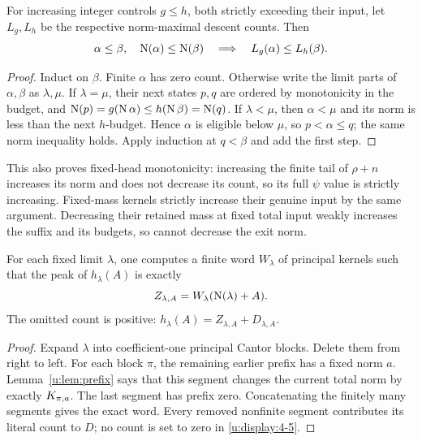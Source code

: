 \begin{lemma}\label{u:lem:counts}
For increasing integer controls $g\le h$, both strictly exceeding their
input, let $L_g,L_h$ be the respective norm-maximal descent counts.
Then
\begin{equation}
 \alpha\le\beta,\quad\operatorname{N}(\alpha)\le\operatorname{N}(\beta)
       \quad\Longrightarrow\quad L_g(\alpha)\le L_h(\beta). \label{u:display:4-4}
\end{equation}
\end{lemma}
\begin{proof}
Induct on $\beta$. Finite $\alpha$ has zero count. Otherwise write the
limit parts of $\alpha,\beta$ as $\lambda,\mu$. If $\lambda=\mu$, their
next states $p,q$ are ordered by monotonicity in the budget, and
$\operatorname{N}(p)=g(\operatorname{N}\alpha)\le h(\operatorname{N}\beta)=\operatorname{N}(q)$.
If $\lambda<\mu$, then $\alpha<\mu$ and its norm is less than the next
$h$-budget. Hence $\alpha$ is eligible below $\mu$, so
$p<\alpha\le q$; the same norm inequality holds. Apply induction at
$q<\beta$ and add the first step.
\end{proof}
This also proves fixed-head monotonicity: increasing the finite tail of
$\rho+n$ increases its norm and does not decrease its count, so its full
$\psi$ value is strictly increasing. Fixed-mass kernels strictly increase
their genuine input by the same argument. Decreasing their retained mass
at fixed total input weakly increases the suffix and its budgets, so cannot
decrease the exit norm.

\begin{lemma}\label{u:lem:peakword}
For each fixed limit $\lambda$, one computes a finite word $W_\lambda$ of
principal kernels such that the peak of $h_\lambda(A)$ is exactly
\begin{equation}
             Z_{\lambda,A}=W_\lambda(\operatorname{N}(\lambda)+A). \label{u:display:4-5}
\end{equation}
The omitted count is positive: $h_\lambda(A)=Z_{\lambda,A}+D_{\lambda,A}$.
\end{lemma}
\begin{proof}
Expand $\lambda$ into coefficient-one principal Cantor blocks. Delete them
from right to left. For each block $\pi$, the remaining earlier prefix has
a fixed norm $a$. Lemma~\ref{u:lem:prefix} says that this segment changes the
current total norm by exactly $K_{\pi,a}$. The last segment has prefix
zero. Concatenating the finitely many segments gives the exact word.
Every removed nonfinite segment contributes its literal count to $D$;
no count is set to zero in \eqref{u:display:4-5}.
\end{proof}

